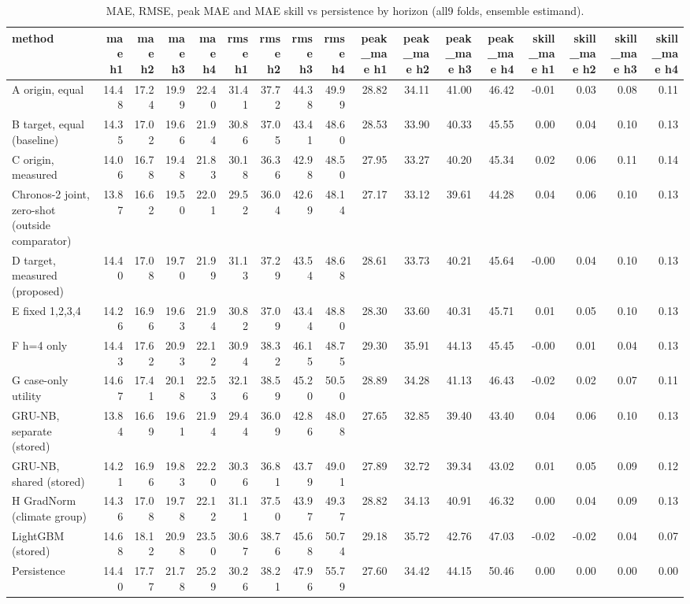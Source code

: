 \begin{table}[t]
\centering
\small
\caption{MAE, RMSE, peak MAE and MAE skill vs persistence by horizon (all9 folds, ensemble estimand).}
\label{tab:metrics-all9-ensemble}
\begin{tabular}{lrrrrrrrrrrrrrrrr}
\toprule
method & mae h1 & mae h2 & mae h3 & mae h4 & rmse h1 & rmse h2 & rmse h3 & rmse h4 & peak\_mae h1 & peak\_mae h2 & peak\_mae h3 & peak\_mae h4 & skill\_mae h1 & skill\_mae h2 & skill\_mae h3 & skill\_mae h4 \\
\midrule
A origin, equal & 14.48 & 17.24 & 19.99 & 22.40 & 31.41 & 37.72 & 44.38 & 49.99 & 28.82 & 34.11 & 41.00 & 46.42 & -0.01 & 0.03 & 0.08 & 0.11 \\
B target, equal (baseline) & 14.35 & 17.02 & 19.66 & 21.94 & 30.86 & 37.05 & 43.41 & 48.60 & 28.53 & 33.90 & 40.33 & 45.55 & 0.00 & 0.04 & 0.10 & 0.13 \\
C origin, measured & 14.06 & 16.78 & 19.48 & 21.83 & 30.18 & 36.36 & 42.98 & 48.50 & 27.95 & 33.27 & 40.20 & 45.34 & 0.02 & 0.06 & 0.11 & 0.14 \\
Chronos-2 joint, zero-shot (outside comparator) & 13.87 & 16.62 & 19.50 & 22.01 & 29.52 & 36.04 & 42.69 & 48.14 & 27.17 & 33.12 & 39.61 & 44.28 & 0.04 & 0.06 & 0.10 & 0.13 \\
D target, measured (proposed) & 14.40 & 17.08 & 19.70 & 21.99 & 31.13 & 37.29 & 43.54 & 48.68 & 28.61 & 33.73 & 40.21 & 45.64 & -0.00 & 0.04 & 0.10 & 0.13 \\
E fixed 1,2,3,4 & 14.26 & 16.96 & 19.63 & 21.94 & 30.82 & 37.09 & 43.44 & 48.80 & 28.30 & 33.60 & 40.31 & 45.71 & 0.01 & 0.05 & 0.10 & 0.13 \\
F h=4 only & 14.43 & 17.62 & 20.93 & 22.12 & 30.94 & 38.32 & 46.15 & 48.75 & 29.30 & 35.91 & 44.13 & 45.45 & -0.00 & 0.01 & 0.04 & 0.13 \\
G case-only utility & 14.67 & 17.41 & 20.18 & 22.53 & 32.16 & 38.59 & 45.20 & 50.50 & 28.89 & 34.28 & 41.13 & 46.43 & -0.02 & 0.02 & 0.07 & 0.11 \\
GRU-NB, separate (stored) & 13.84 & 16.69 & 19.61 & 21.94 & 29.44 & 36.09 & 42.86 & 48.08 & 27.65 & 32.85 & 39.40 & 43.40 & 0.04 & 0.06 & 0.10 & 0.13 \\
GRU-NB, shared (stored) & 14.21 & 16.96 & 19.83 & 22.20 & 30.36 & 36.81 & 43.79 & 49.01 & 27.89 & 32.72 & 39.34 & 43.02 & 0.01 & 0.05 & 0.09 & 0.12 \\
H GradNorm (climate group) & 14.36 & 17.08 & 19.78 & 22.12 & 31.11 & 37.50 & 43.97 & 49.37 & 28.82 & 34.13 & 40.91 & 46.32 & 0.00 & 0.04 & 0.09 & 0.13 \\
LightGBM (stored) & 14.68 & 18.12 & 20.98 & 23.50 & 30.67 & 38.76 & 45.68 & 50.74 & 29.18 & 35.72 & 42.76 & 47.03 & -0.02 & -0.02 & 0.04 & 0.07 \\
Persistence & 14.40 & 17.77 & 21.78 & 25.29 & 30.26 & 38.21 & 47.96 & 55.79 & 27.60 & 34.42 & 44.15 & 50.46 & 0.00 & 0.00 & 0.00 & 0.00 \\
\bottomrule
\end{tabular}
\end{table}
